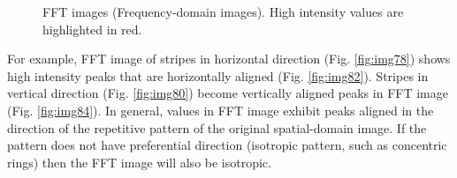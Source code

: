 \begin{figure}[htbp]
 \centering
 \caption{ FFT images (Frequency-domain images). High intensity values are highlighted in red.}
 \label{fig:FFTtransformedStripesDirections}
\end{figure} 


For example, FFT image of stripes in horizontal direction (Fig. \ref{fig:img78}) shows high intensity peaks that are horizontally aligned (Fig. \ref{fig:img82}). 
Stripes in vertical direction (Fig. \ref{fig:img80}) become vertically
aligned peaks in FFT image (Fig. \ref{fig:img84}). 
In general, values in FFT image exhibit peaks aligned in the direction of the repetitive pattern of the original spatial-domain image. If the pattern does not have preferential direction (isotropic pattern, such as concentric rings) then the FFT image will also be isotropic. 

